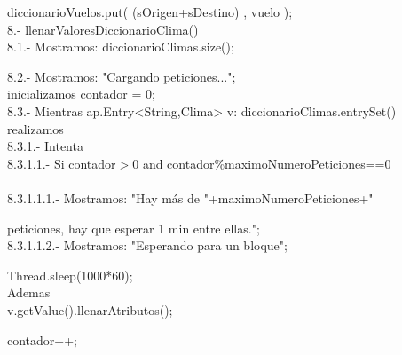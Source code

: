 \documentclass[30pt]{article}
\theoremstyle{definition}
\begin{document}
  \hspace{3cm} diccionarioVuelos.put( (sOrigen+sDestino) , vuelo );\\
  
    \hspace{1cm} 8.- llenarValoresDiccionarioClima()\\

    \hspace{2cm} 8.1.- Mostramos: diccionarioClimas.size();

    \hspace{2cm} 8.2.- Mostramos: "Cargando peticiones...";\\

    \hspace{2cm} inicializamos contador = 0;\\

    \hspace{2cm} 8.3.- Mientras ap.Entry<String,Clima> v:  diccionarioClimas.entrySet() realizamos\\

    \hspace{3cm}8.3.1.- Intenta\\

    \hspace{4cm}8.3.1.1.- Si contador$>$0 and contador\%maximoNumeroPeticiones==0 \\ \\

    \hspace{5cm}8.3.1.1.1.- Mostramos: "Hay más de "+maximoNumeroPeticiones+" 
    
    \hspace{6.5cm} peticiones, hay que esperar 1 min entre ellas.";\\
    
    \hspace{5cm}8.3.1.1.2.- Mostramos: "Esperando para un bloque";
    
    \hspace{6.5cm} Thread.sleep(1000*60);\\
    
    \hspace{3cm} Ademas\\
    
    \hspace{3cm} v.getValue().llenarAtributos();
    
  \hspace{3cm} contador++;\\
\end{document}
